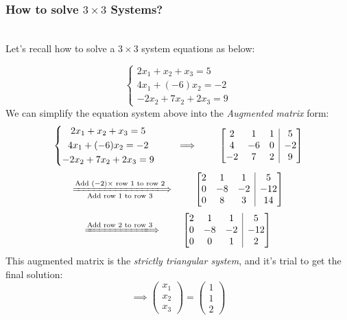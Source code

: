 \subsubsection{How to solve $3 \times 3$ Systems?}

\begin{example} \qquad
\\
Let's recall how to solve a $3 \times 3$ system equations as below:

\[
\left \{	\begin{gathered}
2x_1 + x_2 +x_3=5 	\\
4x_1 + (-6)x_2 = -2 \\
-2x_2+7x_2+2x_3 = 9
\end{gathered}	\right.
\]
We can simplify the equation system above into the \emph{Augmented matrix} form:
\[
\left \{	\begin{gathered}
2x_1 + x_2 +x_3=5 	\\
4x_1 + (-6)x_2 = -2 \\
-2x_2+7x_2+2x_3 = 9
\end{gathered}	\right.
\qquad \implies \qquad
\left[
\begin{array}{@{}ccc|c@{}}
2 & 1 & 1 & 5\\
4 & -6 & 0 & -2\\
-2 & 7 & 2 & 9
\end{array}
\right]
\]
%
\[
\xLongrightarrow[\text{Add row 1 to row 3}]{\text{Add $(-2)\times$ row 1 to row 2}}{\quad\quad}
\left[
\begin{array}{@{}ccc|c@{}}
2 & 1 & 1 & 5\\
0 & -8 & -2 & -12\\
0 & 8 & 3 & 14
\end{array}
\right]
\]
\[\xLongrightarrow{\text{Add row 2 to row 3}}{\quad\quad}
\left[
\begin{array}{@{}ccc|c@{}}
2 & 1 & 1 & 5\\
0 & -8 & -2 & -12\\
0 & 0 & 1 & 2
\end{array}
\right]\]
This augmented matrix is the \emph{strictly triangular system}, and it's trial to get the final solution:
\[\implies
\begin{pmatrix}
x_1\\x_2\\x_3
\end{pmatrix}=
\begin{pmatrix}
1\\1\\2
\end{pmatrix}\]
\end{example}

